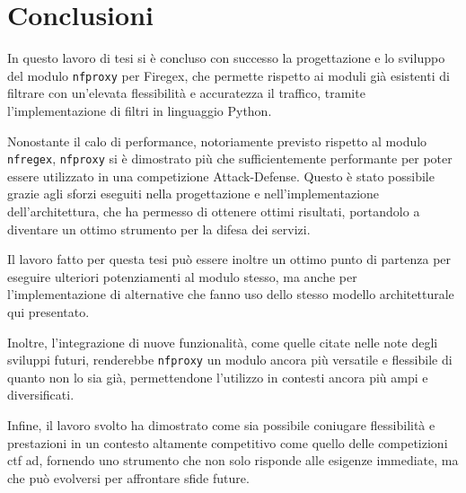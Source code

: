 \chapter*{Conclusioni}\label{chap:ending}

In questo lavoro di tesi si è concluso con successo la progettazione e lo sviluppo del modulo \texttt{\gls{nfproxy}} per Firegex, che permette rispetto ai moduli già esistenti di filtrare con un'elevata flessibilità e accuratezza il traffico, tramite l'implementazione di filtri in linguaggio Python.

Nonostante il calo di performance, notoriamente previsto rispetto al modulo \texttt{\gls{nfregex}}, \texttt{\gls{nfproxy}} si è dimostrato più che sufficientemente performante per poter essere utilizzato in una competizione Attack-Defense. Questo è stato possibile grazie agli sforzi eseguiti nella progettazione e nell'implementazione dell'architettura, che ha permesso di ottenere ottimi risultati, portandolo a diventare un ottimo strumento per la difesa dei servizi.

Il lavoro fatto per questa tesi può essere inoltre un ottimo punto di partenza per eseguire ulteriori potenziamenti al modulo stesso, ma anche per l'implementazione di alternative che fanno uso dello stesso modello architetturale qui presentato.

Inoltre, l'integrazione di nuove funzionalità, come quelle citate nelle note degli sviluppi futuri, renderebbe \texttt{\gls{nfproxy}} un modulo ancora più versatile e flessibile di quanto non lo sia già, permettendone l'utilizzo in contesti ancora più ampi e diversificati.

Infine, il lavoro svolto ha dimostrato come sia possibile coniugare flessibilità e prestazioni in un contesto altamente competitivo come quello delle competizioni \gls{ctf} \gls{ad}, fornendo uno strumento che non solo risponde alle esigenze immediate, ma che può evolversi per affrontare sfide future.
